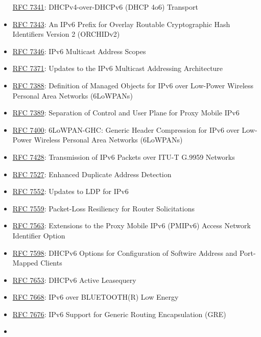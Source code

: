 \documentclass[
]{article}
\begin{document}
\begin{itemize}
  \href{https://www.rfc-editor.org/info/rfc7341}{RFC 7341}:
  DHCPv4-over-DHCPv6 (DHCP 4o6) Transport
\item
  \href{https://www.rfc-editor.org/info/rfc7343}{RFC 7343}: An IPv6
  Prefix for Overlay Routable Cryptographic Hash Identifiers Version 2
  (ORCHIDv2)
\item
  \href{https://www.rfc-editor.org/info/rfc7346}{RFC 7346}: IPv6
  Multicast Address Scopes
\item
  \href{https://www.rfc-editor.org/info/rfc7371}{RFC 7371}: Updates to
  the IPv6 Multicast Addressing Architecture
\item
  \href{https://www.rfc-editor.org/info/rfc7388}{RFC 7388}: Definition
  of Managed Objects for IPv6 over Low-Power Wireless Personal Area
  Networks (6LoWPANs)
\item
  \href{https://www.rfc-editor.org/info/rfc7389}{RFC 7389}: Separation
  of Control and User Plane for Proxy Mobile IPv6
\item
  \href{https://www.rfc-editor.org/info/rfc7400}{RFC 7400}: 6LoWPAN-GHC:
  Generic Header Compression for IPv6 over Low-Power Wireless Personal
  Area Networks (6LoWPANs)
\item
  \href{https://www.rfc-editor.org/info/rfc7428}{RFC 7428}: Transmission
  of IPv6 Packets over ITU-T G.9959 Networks
\item
  \href{https://www.rfc-editor.org/info/rfc7527}{RFC 7527}: Enhanced
  Duplicate Address Detection
\item
  \href{https://www.rfc-editor.org/info/rfc7552}{RFC 7552}: Updates to
  LDP for IPv6
\item
  \href{https://www.rfc-editor.org/info/rfc7559}{RFC 7559}: Packet-Loss
  Resiliency for Router Solicitations
\item
  \href{https://www.rfc-editor.org/info/rfc7563}{RFC 7563}: Extensions
  to the Proxy Mobile IPv6 (PMIPv6) Access Network Identifier Option
\item
  \href{https://www.rfc-editor.org/info/rfc7598}{RFC 7598}: DHCPv6
  Options for Configuration of Softwire Address and Port-Mapped Clients
\item
  \href{https://www.rfc-editor.org/info/rfc7653}{RFC 7653}: DHCPv6
  Active Leasequery
\item
  \href{https://www.rfc-editor.org/info/rfc7668}{RFC 7668}: IPv6 over
  BLUETOOTH(R) Low Energy
\item
  \href{https://www.rfc-editor.org/info/rfc7676}{RFC 7676}: IPv6 Support
  for Generic Routing Encapsulation (GRE)
\item

\end{itemize}
\end{document}
